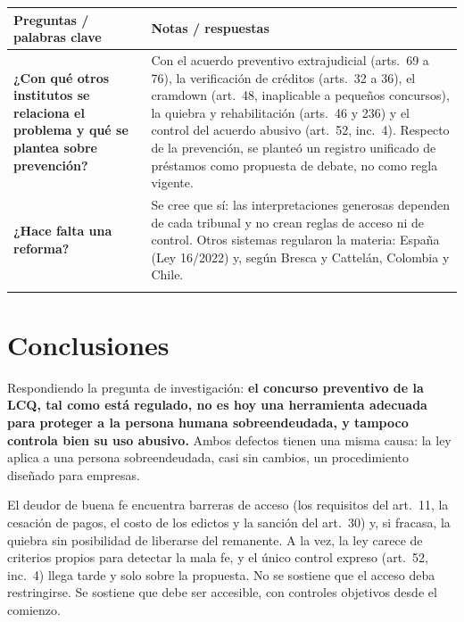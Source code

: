 \documentclass[12pt,oneside]{book}
\makeatletter
\newcommand{\cornellresumen}[1]{%
  \midrule
  \multicolumn{2}{@{}p{\dimexpr0.92\textwidth+2\tabcolsep+\arrayrulewidth\relax}@{}}{%
    \textbf{Resumen:} #1} \\
}
\newenvironment{cornell}{%
  \renewcommand{\arraystretch}{1.2}%
  \begin{longtable}{@{}>{\raggedright\arraybackslash}p{0.27\textwidth}|>{\raggedright\arraybackslash}p{0.65\textwidth}@{}}
  \toprule
  \textbf{Preguntas / palabras clave} & \textbf{Notas / respuestas} \\
  \midrule
  \endhead
}{%
  \bottomrule
  \end{longtable}%
}
\makeatother
\begin{document}
\begin{cornell}
\textbf{¿Con qué otros institutos se relaciona el problema y qué se plantea sobre prevención?} &
Con el acuerdo preventivo extrajudicial (arts.~69 a 76), la verificación de créditos (arts.~32 a 36), el cramdown (art.~48, inaplicable a pequeños concursos), la quiebra y rehabilitación (arts.~46 y 236) y el control del acuerdo abusivo (art.~52, inc.~4). Respecto de la prevención, se planteó un registro unificado de préstamos como propuesta de debate, no como regla vigente. \\
\addlinespace

\textbf{¿Hace falta una reforma?} &
Se cree que sí: las interpretaciones generosas dependen de cada tribunal y no crean reglas de acceso ni de control. Otros sistemas regularon la materia: España (Ley 16/2022) y, según Bresca y Cattelán, Colombia y Chile. \\
\cornellresumen{El régimen vigente impone a la persona humana un trámite empresario, con barreras de acceso, control tardío del abuso y sin segunda oportunidad. Hay abuso posible en ambas direcciones y tensión entre principios. Las soluciones judiciales son valiosas pero no crean reglas, por lo que se considera necesaria una reforma.}
\end{cornell}

\chapter[Conclusiones]{Conclusiones}
\label{cap:conclusiones}

Respondiendo la pregunta de investigación: \textbf{el concurso preventivo de la LCQ, tal como está regulado, no es hoy una herramienta adecuada para proteger a la persona humana sobreendeudada, y tampoco controla bien su uso abusivo.} Ambos defectos tienen una misma causa: la ley aplica a una persona sobreendeudada, casi sin cambios, un procedimiento diseñado para empresas.

El deudor de buena fe encuentra barreras de acceso (los requisitos del art.~11, la cesación de pagos, el costo de los edictos y la sanción del art.~30) y, si fracasa, la quiebra sin posibilidad de liberarse del remanente. A la vez, la ley carece de criterios propios para detectar la mala fe, y el único control expreso (art.~52, inc.~4) llega tarde y solo sobre la propuesta. No se sostiene que el acceso deba restringirse. Se sostiene que debe ser accesible, con controles objetivos desde el comienzo.
\end{document}
